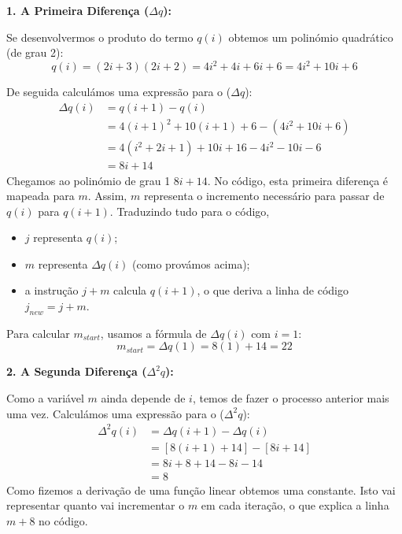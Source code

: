 \documentclass[11pt, a4paper, fleqn]{article}
\begin{document}
\noindent \textbf{1. A Primeira Diferença ($\Delta q$):}

\noindent Se desenvolvermos o produto do termo $q(i)$ obtemos um polinómio quadrático (de grau 2):
\begin{equation}
    q(i) = (2i+3)(2i+2) = 4i^2 + 4i + 6i + 6 = 4i^2 + 10i + 6
\end{equation}

\noindent De seguida calculámos uma expressão para o ($\Delta q$):
\begin{align*}
    \Delta q(i) &= q(i+1) - q(i) \\
    &= 4(i+1)^2 + 10(i+1) + 6 - (4i^2 + 10i + 6) \\
    &= 4(i^2+2i+1) + 10i + 16 - 4i^2 - 10i - 6 \\
    &= 8i + 14
\end{align*}
\noindent Chegamos ao polinómio de grau 1 $8i + 14$.
No código, esta primeira diferença é mapeada para $m$. Assim, $m$ representa o incremento necessário para passar de $q(i)$ para $q(i+1)$.
Traduzindo tudo para o código,
\begin{itemize}
    \item $j$ representa $q(i)$;
    \item $m$ representa $\Delta q(i)$ (como provámos acima);
    \item a instrução $j + m$ calcula $q(i+1)$, o que deriva a linha de código $j_{new} = j + m$.
\end{itemize}

\noindent Para calcular $m_{start}$, usamos a fórmula de $\Delta q(i)$ com $i=1$:
\begin{equation}
    m_{start} = \Delta q(1) = 8(1) + 14 = 22
\end{equation}

\noindent \textbf{2. A Segunda Diferença ($\Delta^2 q$):}

\noindent Como a variável $m$ ainda depende de $i$, temos de fazer o processo anterior mais uma vez.
Calculámos uma expressão para o ($\Delta^2 q$):
\begin{align*}
    \Delta^2 q(i) &= \Delta q(i+1) - \Delta q(i) \\
    &= [8(i+1) + 14] - [8i + 14] \\
    &= 8i + 8 + 14 - 8i - 14 \\
    &= 8
\end{align*}
Como fizemos a derivação de uma função linear obtemos uma constante.
Isto vai representar quanto vai incrementar o $m$ em cada iteração, o que explica a linha $m + 8$ no código.
\end{document}
